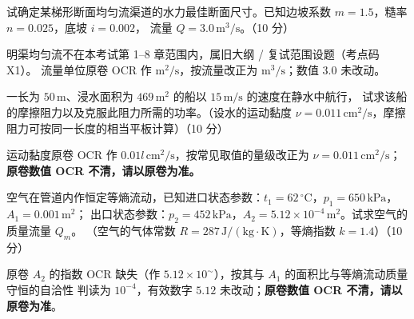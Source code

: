 \begin{ti}
  \item 试确定某梯形断面均匀流渠道的水力最佳断面尺寸。已知边坡系数 $m=1.5$，糙率 $n=0.025$，底坡 $i=0.002$，
  流量 $Q=3.0\,\mathrm{m^3/s}$。（10 分）\hfill{}
  \begin{tishi}明渠均匀流不在本考试第 1--8 章范围内，属旧大纲 / 复试范围设题（考点码 X1）。
  流量单位原卷 OCR 作 $\mathrm{m^2/s}$，按流量改正为 $\mathrm{m^3/s}$；数值 $3.0$ 未改动。\end{tishi}

  \item 一长为 $50\,\mathrm{m}$、浸水面积为 $469\,\mathrm{m^2}$ 的船以 $15\,\mathrm{m/s}$ 的速度在静水中航行，
  试求该船的摩擦阻力以及克服此阻力所需的功率。（设水的运动黏度 $\nu=0.011\,\mathrm{cm^2/s}$，摩擦阻力可按同一长度的相当平板计算）（10 分）\hfill{}
  \begin{tishi}运动黏度原卷 OCR 作 $0.01l\,\mathrm{cm^2/s}$，按常见取值的量级改正为 $\nu=0.011\,\mathrm{cm^2/s}$；
  \textbf{原卷数值 OCR 不清，请以原卷为准。}\end{tishi}

  \item 空气在管道内作恒定等熵流动，已知进口状态参数：$t_1=62\,^{\circ}\mathrm{C}$，$p_1=650\,\mathrm{kPa}$，$A_1=0.001\,\mathrm{m^2}$；
  出口状态参数：$p_2=452\,\mathrm{kPa}$，$A_2=5.12\times10^{-4}\,\mathrm{m^2}$。试求空气的质量流量 $Q_m$。
  （空气的气体常数 $R=287\,\mathrm{J/(kg\cdot K)}$，等熵指数 $k=1.4$）（10 分）\hfill{}
  \begin{tishi}原卷 $A_2$ 的指数 OCR 缺失（作 $5.12\times10^{\sim}$），按其与 $A_1$ 的面积比与等熵流动质量守恒的自洽性
  判读为 $10^{-4}$，有效数字 $5.12$ 未改动；\textbf{原卷数值 OCR 不清，请以原卷为准}。\end{tishi}
\end{ti}
